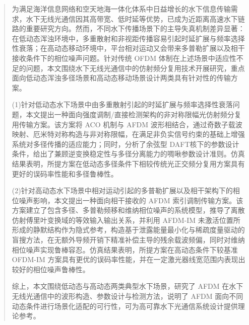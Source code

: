 
\begin{abstract}
  为满足海洋信息网络和空天地海一体化体系中日益增长的水下信息传输需求，水下无线光通信因其高带宽、低时延等优势，已成为近距离高速水下链路的重要研究方向。然而，不同水下传播场景下的主导失真机制差异显著：在低动态浑浊环境中，多重散射和非视距传播容易引起时延扩展与频率选择性衰落；在高动态移动环境中，平台相对运动又会带来多普勒扩展以及相干接收条件下的相位噪声问题。针对传统 OFDM 体制在上述场景中适应性不足的问题，本文围绕水下无线光通信中的仿射频分复用技术开展研究，重点面向低动态浑浊多径场景和高动态移动场景设计两类具有针对性的传输方案。

  (1)针对低动态水下场景中由多重散射引起的时延扩展与频率选择性衰落问题，本文提出一种面向强度调制/直接检测架构的非对称限幅光仿射频分复用传输方案。该方案将 ACO 机制与 AFDM 波形相结合，通过奇数子载波映射、厄米特对称构造与非对称限幅，在满足非负实信号约束的基础上增强系统对多径传播的适应能力；同时，分析了余弦型 DAFT核下的参数设计条件，给出了兼顾逆变换稳定性与多径分离能力的啁啾参数设计准则。仿真结果表明，所提方案在低动态多径条件下相较传统光正交频分复用方案具有更好的误码率性能和多径鲁棒性。

  (2)针对高动态水下场景中相对运动引起的多普勒扩展以及相干架构下的相位噪声影响，本文提出一种面向相干接收的 AFDM 索引调制传输方案。该方案建立了包含多径、多普勒频移和维纳相位噪声的系统模型，推导了离散仿射傅里叶变换域的等效输入输出关系，并利用 AFDM-IM 未激活位置所形成的静默结构作为隐式参考，构造基于泄露能量最小化与稀疏度量驱动的盲搜方法，在无额外导频开销下精准补偿主导的残余载波频偏，同时对维纳相位噪声实现鲁棒容忍。仿真结果表明，所提方案在高动态条件下较基准 OFDM-IM 方案具有更优的误码率性能，并在一定激光器线宽范围内表现出较好的相位噪声鲁棒性。

  综上，本文围绕低动态与高动态两类典型水下场景，研究了 AFDM 在水下无线光通信中的波形构造、参数设计与检测方法，说明了 AFDM 面向不同动态条件进行场景化适配的可行性，可为高可靠水下光通信系统设计提供理论参考。  
\end{abstract}


